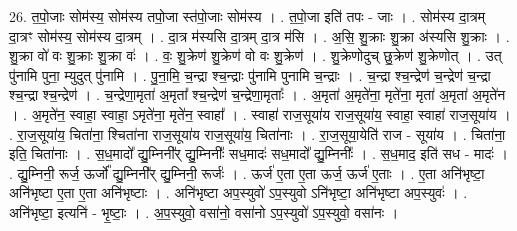 \documentclass[17pt]{extarticle}
\begin{document}
26. त॒पो॒जाः सोम॑स्य॒ सोम॑स्य तपो॒जा स्त॑पो॒जाः सोम॑स्य । . त॒पो॒जा इति॑ तपः - जाः । . सोम॑स्य दा॒त्रम् दा॒त्रꣳ सोम॑स्य॒ सोम॑स्य दा॒त्रम् । . दा॒त्र म॑स्यसि दा॒त्रम् दा॒त्र म॑सि । . अ॒सि॒ शु॒क्राः शु॒क्रा अ॑स्यसि शु॒क्राः । . शु॒क्रा वो॑ वः शु॒क्राः शु॒क्रा वः॑ । . वः॒ शु॒क्रेण॑ शु॒क्रेण॑ वो वः शु॒क्रेण॑ । . शु॒क्रेणोदुच् छु॒क्रेण॑ शु॒क्रेणोत् । . उत् पु॑नामि पुना॒ म्युदुत् पु॑नामि । . पु॒ना॒मि॒ च॒न्द्रा श्च॒न्द्राः पु॑नामि पुनामि च॒न्द्राः । . च॒न्द्रा श्च॒न्द्रेण॑ च॒न्द्रेण॑ च॒न्द्रा श्च॒न्द्रा श्च॒न्द्रेण॑ । . च॒न्द्रेणा॒मृता॑ अ॒मृता᳚ श्च॒न्द्रेण॑ च॒न्द्रेणा॒मृताः᳚ । . अ॒मृता॑ अ॒मृते॑ना॒ मृते॑ना॒ मृता॑ अ॒मृता॑ अ॒मृते॑न । . अ॒मृते॑न॒ स्वाहा॒ स्वाहा॒ ऽमृते॑ना॒ मृते॑न॒ स्वाहा᳚ । . स्वाहा॑ राज॒सूया॑य राज॒सूया॑य॒ स्वाहा॒ स्वाहा॑ राज॒सूया॑य । . रा॒ज॒सूया॑य॒ चिता॑ना॒ श्चिता॑ना राज॒सूया॑य राज॒सूया॑य॒ चिता॑नाः । . रा॒ज॒सूया॒येति॑ राज - सूया॑य । . चिता॑ना॒ इति॒ चिता॑नाः । . स॒ध॒मादो᳚ द्यु॒म्निनी᳚र् द्यु॒म्निनीः᳚ सध॒मादः॑ सध॒मादो᳚ द्यु॒म्निनीः᳚ । . स॒ध॒माद॒ इति॑ सध - मादः॑ । . द्यु॒म्निनी॒ रूर्ज॒ ऊर्जो᳚ द्यु॒म्निनी᳚र् द्यु॒म्निनी॒ रूर्जः॑ । . ऊर्ज॑ ए॒ता ए॒ता ऊर्ज॒ ऊर्ज॑ ए॒ताः । . ए॒ता अनि॑भृष्टा॒ अनि॑भृष्टा ए॒ता ए॒ता अनि॑भृष्टाः । . अनि॑भृष्टा अप॒स्युवो॑ ऽप॒स्युवो ऽनि॑भृष्टा॒ अनि॑भृष्टा अप॒स्युवः॑ । . अनि॑भृष्टा॒ इत्यनि॑ - भृ॒ष्टाः॒ । . अ॒प॒स्युवो॒ वसा॑नो॒ वसा॑नो ऽप॒स्युवो॑ ऽप॒स्युवो॒ वसा॑नः । \newline
\end{document}
